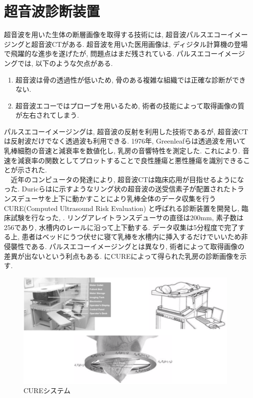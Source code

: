 \section{超音波診断装置}
超音波を用いた生体の断層画像を取得する技術には, 超音波パルスエコーイメージングと超音波CTがある. 超音波を用いた医用画像は, ディジタル計算機の登場で飛躍的な進歩を遂げたが, 問題点はまだ残されている. パルスエコーイメージングでは, 以下のような欠点がある. 
\begin{enumerate}
   \item 超音波は骨の透過性が低いため, 骨のある複雑な組織では正確な診断ができない.
   \item 超音波エコーではプローブを用いるため, 術者の技能によって取得画像の質が左右されてしまう.
\end{enumerate}
パルスエコーイメージングは, 超音波の反射を利用した技術であるが, 超音波CTは反射波だけでなく透過波も利用できる. 1976年, Greenleafらは透過波を用いて乳棒細胞の音速と減衰率を数値化し, 乳房の音響特性を測定した\cite{onkyou}. これにより. 音速を減衰率の関数としてプロットすることで良性腫瘍と悪性腫瘍を識別できることが示された.
\\\ \ 近年のコンピュータの発達により, 超音波CTは臨床応用が目指せるようになった. Duricらはに示すようなリング状の超音波の送受信素子が配置されたトランスデューサを上下に動かすことにより乳棒全体のデータ収集を行うCURE(Computed Ultrasound Risk Evaluation) と呼ばれる診断装置を開発し, 臨床試験を行なった\cite{cure1}, \cite{cure2}. リングアレイトランスデューサの直径は200mm, 素子数は256であり, 水槽内のレールに沿って上下動する. データ収集は5分程度で完了する上, 患者はベッドにうつ伏せに寝て乳棒を水槽内に挿入するだけでいいため非侵襲性である. パルスエコーイメージングとは異なり, 術者によって取得画像の差異が出ないという利点もある. にCUREによって得られた乳房の診断画像を示す.
\begin{figure}[h]
  \begin{center}
    \includegraphics[width=110mm]{fig/curesystem.pdf}
  \end{center}
  \caption{CUREシステム}
\end{figure}
